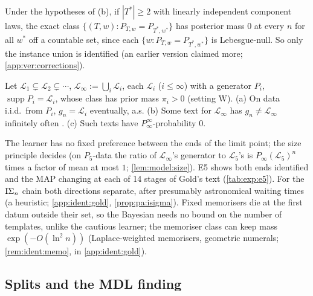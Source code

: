 \begin{remark}\label{rem:ident:exact}
Under the hypotheses of (b), if $|T^*|\ge2$ with linearly independent component laws, the exact class $\{(T,w):P_{T,w}=P_{T^*,w^*}\}$ has posterior mass $0$ at every $n$ for all $w^*$ off a countable set, since each $\{w:P_{T,w}=P_{T^*,w^*}\}$ is Lebesgue-null. So only the instance union is identified (an earlier version claimed more; \cref{app:ver:corrections}).
\end{remark}

\begin{proposition}\label{prop:ident:gold}
Let $\mathcal L_1\subsetneq\mathcal L_2\subsetneq\cdots$, $\mathcal L_\infty:=\bigcup_i\mathcal L_i$, each $\mathcal L_i$ ($i\le\infty$) with a generator $P_i$, $\operatorname{supp}P_i=\mathcal L_i$, whose class has prior mass $\pi_i>0$ (setting W). (a) On data i.i.d.\ from $P_i$, $g_n=\mathcal L_i$ eventually, a.s. (b) Some text for $\mathcal L_\infty$ has $g_n\ne\mathcal L_\infty$ infinitely often \citep{gold1967language}. (c) Such texts have $P_\infty^\infty$-probability $0$.
\end{proposition}

\noindent The learner has no fixed preference between the ends of the limit point; the size principle decides (on $P_5$-data the ratio of $\mathcal L_\infty$'s generator to $\mathcal L_5$'s is $P_\infty(\mathcal L_5)^n$ times a factor of mean at most $1$; \cref{lem:model:size}). E5 shows both ends identified and the MAP changing at each of 14 stages of Gold's text (\cref{tab:exp:e5}). For the $\mathrm{I}\Sigma_{n}$ chain both directions separate, after presumably astronomical waiting times (a heuristic; \cref{app:ident:gold}, \cref{prop:pa:isigma}). Fixed memorisers die at the first datum outside their set, so the Bayesian needs no bound on the number of templates, unlike the cautious learner; the memoriser class can keep mass $\exp(-O(\ln^2n))$ (Laplace-weighted memorisers, geometric numerals; \cref{rem:ident:memo}, in \cref{app:ident:gold}).

\subsection{Splits and the MDL finding}\label{sec:ident:mdl}

